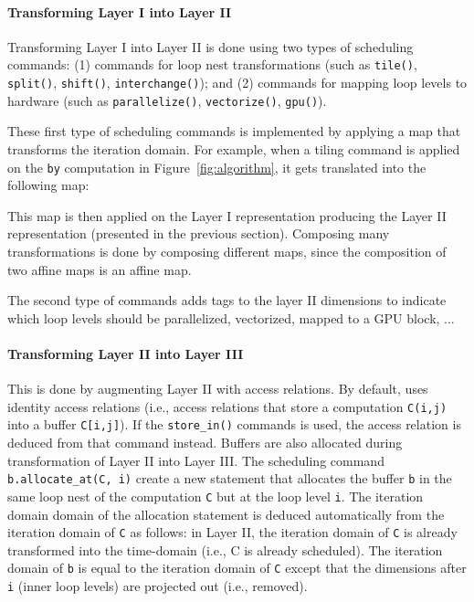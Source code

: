 \paragraph{Transforming Layer I into Layer II}
Transforming Layer I into Layer II is done using two types of scheduling commands: (1) commands for loop nest transformations (such as \texttt{tile()}, \texttt{split()}, \texttt{shift()}, \texttt{interchange()}); and (2) commands for mapping loop levels to hardware (such as \texttt{parallelize()}, \texttt{vectorize()}, \texttt{gpu()}).

These first type of scheduling commands is implemented by applying a map that transforms the iteration domain.  For example, when a tiling command is applied on the \texttt{by} computation in Figure~\ref{fig:algorithm}, it gets translated into the following map:

\centerline{}
\centerline{}

This map is then applied on the Layer I representation producing the Layer II representation (presented in the previous section). Composing many transformations is done by composing different maps, since the composition of two affine maps is an affine map.

The second type of commands adds \processor tags to the layer II dimensions to indicate which loop levels should be parallelized, vectorized, mapped to a GPU block, ...

\vspace{-0.25cm}
\paragraph{Transforming Layer II into Layer III}
This is done by augmenting Layer II with access relations.  By default, \framework{} uses identity access relations (i.e., access relations that store a computation \texttt{C(i,j)} into a buffer \texttt{C[i,j]}).  If the \texttt{store\_in()} commands is used, the access relation is deduced from that command instead.  Buffers are also allocated during transformation of Layer II into Layer III. The scheduling command \texttt{b.allocate\_at(C, i)} create a new statement that allocates the buffer \texttt{b} in the same loop nest of the computation \texttt{C} but at the loop level \texttt{i}.
The iteration domain domain of the allocation statement is deduced automatically from the iteration domain of \texttt{C} as follows: in Layer II, the iteration domain of \texttt{C} is already transformed into the time-\processor domain (i.e., C is already scheduled).  The iteration domain of \texttt{b} is equal to the iteration domain of \texttt{C} except that the dimensions after \texttt{i} (inner loop levels) are projected out (i.e., removed).

